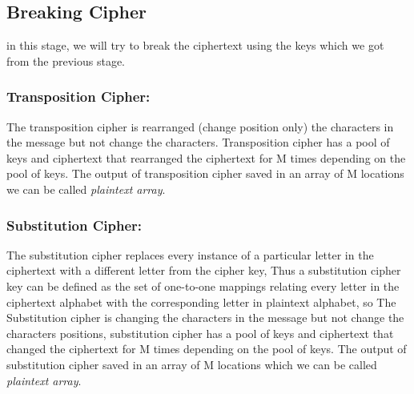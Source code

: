 \subsection{Breaking Cipher}
in this stage, we will try to break the ciphertext using the keys which we got from the previous stage.
\subsubsection{Transposition Cipher:}
The transposition cipher is rearranged (change position only) the characters in the message but not change the characters. Transposition cipher has a pool of keys and ciphertext that rearranged the ciphertext for M times depending on the pool of keys. The output of transposition cipher saved in an array of M locations we can be called \textit{plaintext array}.
\subsubsection{Substitution Cipher:}
The substitution cipher replaces every instance of a particular letter in the ciphertext with a different letter from the cipher key, Thus a substitution cipher key can be defined as the set of one-to-one mappings relating every letter in the ciphertext alphabet with the corresponding letter in plaintext alphabet, so The Substitution cipher is changing the characters in the message but not change the characters positions, substitution cipher has a pool of keys and ciphertext that changed the ciphertext for M times depending on the pool of keys. The output of substitution cipher saved in an array of M locations which we can be called \textit{plaintext array}.
